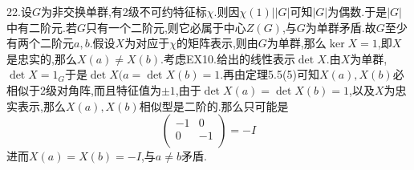 \documentclass[b5paper]{ctexart}
\begin{document}
22.设$G$为非交换单群,有2级不可约特征标$\chi$.则因$\chi(1)||G|$可知$|G|$为偶数.于是$|G|$中有二阶元.若$G$只有一个二阶元,则它必属于中心$Z(G)$,与$G$为单群矛盾.故$G$至少有两个二阶元$a,b$.假设$X$为对应于$\chi$的矩阵表示,则由$G$为单群,那么$\ker X={1}$,即$X$是忠实的,那么$X(a)\neq X(b)$.考虑EX10.给出的线性表示$\det X$.由$X$为单群,$\det X=1_{G}$于是$\det X(a=\det X(b)=1.$再由定理5.5(5)可知$X(a),X(b)$必相似于2级对角阵,而且特征值为$\pm 1$,由于$\det X(a)=\det X(b)=1$,以及$X$为忠实表示,那么$X(a),X(b)$相似型是二阶的.那么只可能是
\[\left( 
\begin{array}{cc}
-1 & 0\\
0 & -1\\
\end{array}\right)=-I\]
进而$X(a)=X(b)=-I$,与$a\neq b$矛盾.
\end{document}
